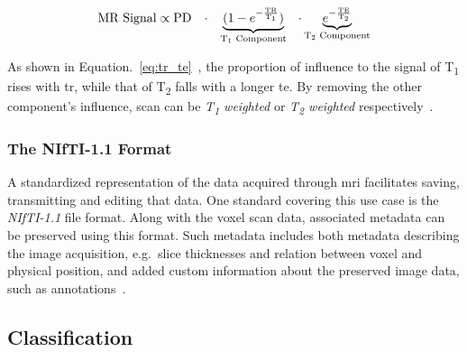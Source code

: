 \begin{equation}\label{eq:tr_te}
    \textnormal{MR Signal} \propto \text{PD}\;\;\:\cdot\;\;\:\underbrace{(1-e^{-\frac{\text{TR}}{\text{T}_1}})}_{\text{T\textsubscript{1} Component}} \;\;\:\cdot \underbrace{e^{-\frac{\text{TE}}{\text{T}_2}}}_{\text{T\textsubscript{2} Component}}
\end{equation}

As shown in Equation.~\ref{eq:tr_te}~\cite[p.~26]{mri_handbook}, the proportion 
of influence to the signal of T\textsubscript{1} rises with \ac{tr}, while that of T\textsubscript{2} 
falls with a longer \ac{te}. By removing the other component's influence,
 scan can be \textit{T\textsubscript{1} weighted} or \textit{T\textsubscript{2} weighted} 
respectively~\cite{medical_imaging,introduction_to_particle_physics,mri_the_basics}.

\subsubsection{The NIfTI-1.1 Format}

A standardized representation of the data acquired through \ac{mri} facilitates
saving, transmitting and editing that data. One standard covering this use case is the
\textit{NIfTI-1.1} file format. Along with the voxel scan data, associated metadata
can be preserved using this format. Such metadata includes both metadata 
describing the image acquisition, e.g.~slice thicknesses and relation between
voxel and physical position, and added custom information about the preserved 
image data, such as annotations~\cite{nifti-1}.

\subsection{Classification}\label{sec:intro_classification}


